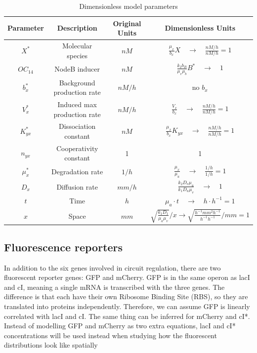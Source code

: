 \begin{table}[H]
    \centering
    \caption{Dimensionless model parameters}
    \label{tab:Dimensionless_params}
    \renewcommand{\arraystretch}{2.3} %
    \begin{tabular}{|c|c|c|c|}
        \hline
        \textbf{Parameter} & \textbf{Description} & \textbf{Original Units} & \textbf{Dimensionless Units} \\
        \hline
        $X^*$ & Molecular species & $nM$ & $\frac{\mu_{x}}{b_{x}}X \quad \rightarrow \quad  \frac{nM/h}{nM/h}  = 1$
        \\
        \hline

        $OC_{14}$ & NodeB inducer & $nM$ & $\frac{k_{2} b_{B}}{\mu_{v} \mu_{b}} B^* \quad \rightarrow \quad  1$
        \\
        \hline
        $b_{x}^*$ & Background production rate & $nM/h$ & no $b_{x} $\\
        \hline
        $ V_{x}^*$  & Induced max production rate & $nM/h$ & $ \frac{V_{x}}{b_{x}} \quad \rightarrow \quad  \frac{nM/h}{nM/h} = 1 $\\
        \hline
        $K_{yx}^*$ & Dissociation constant & $nM$ & $ \frac{\mu_{x}}{b_{x}} K_{yx} \quad \rightarrow \quad \frac{nM/h}{nM/h} = 1 $\\
        \hline
        $ n_{yx}$  & Cooperativity constant & 1 & 1\\
        \hline
        $ \mu_{x}^* $ & Degradation rate & $1/h$ & $\frac{\mu_{x}}{\mu_{a}} \quad \rightarrow \quad  \frac{1/h}{1/h}=1 $\\
        \hline
        $D_{x}$ & Diffusion rate & $mm/h$ & $ \frac{k_{2} D_{v} \mu_{u}}{k_{1} D_{u} \mu_{v}} \quad \rightarrow \quad  1$  \\
        \hline
        $ t $ & Time & $h$ & $\mu_{a} \cdot t \quad \rightarrow \quad  h \cdot  h^{-1} =1$\\
        \hline
        $ x$  & Space & $mm$ & $\sqrt{\frac{k_{1} D_{1}}{\mu_{a}\mu_{v}} }/x \rightarrow  \sqrt{\frac{h^{-1} mm^{2} h^{-1}}{h^{-1}h^{-1}}}/mm  = 1$ \\
        \hline
    \end{tabular}
\end{table}

\subsection{Fluorescence reporters}
In addition to the six genes involved in circuit regulation, there are two fluorescent reporter genes: GFP and mCherry.
GFP is in the same operon as lacI and cI, meaning a single mRNA is transcribed with the three genes.
The difference is that each have their own Ribosome Binding Site (RBS), so they are translated into proteins independently.
Therefore, we can assume GFP is linearly correlated with lacI and cI.
The same thing can be inferred for mCherry and cI*.
Instead of modelling GFP and mCherry as two extra equations, lacI and cI* concentrations will be used instead when studying how the fluorescent distributions look like spatially

